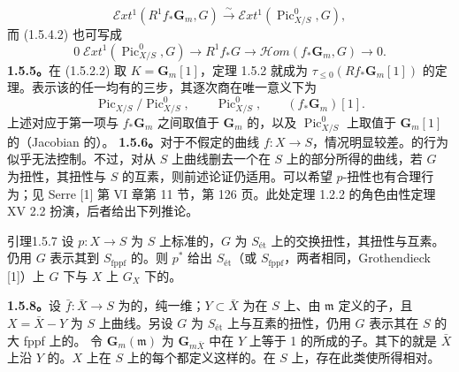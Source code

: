 \[\mathcal Ext^1(R^1f_*\mathbf G_m,G)\xrightarrow\sim\mathcal Ext^1(\operatorname{Pic}^0_{X/S},G),\]
而 (1.5.4.2) 也可写成
\[0\;\mathcal Ext^1(\operatorname{Pic}^0_{X/S},G)\to R^1f_*G\to\mathcal Hom(f_*\mathbf G_m,G)\to0.\tag{1.5.4.3}\]
\textbf{1.5.5。}在 (1.5.2.2) 取 $K=\mathbf G_m[1]$，定理 1.5.2 就成为 $\tau_{\le0}(Rf_*\mathbf G_m[1])$ 的定理。表示该的任一均有的三步，其逐次商在唯一意义下为
\[\operatorname{Pic}_{X/S}/\operatorname{Pic}^0_{X/S},\qquad\operatorname{Pic}^0_{X/S},\qquad(f_*\mathbf G_m)[1].\]
上述对应于第一项与 $f_*\mathbf G_m$ 之间取值于 $\mathbf G_m$ 的，以及 $\operatorname{Pic}^0_{X/S}$ 上取值于 $\mathbf G_m[1]$ 的（Jacobian 的）。
\textbf{1.5.6。}对于不假定的曲线 $f:X\to S$，情况明显较差。的行为似乎无法控制。不过，对从 $S$ 上曲线删去一个在 $S$ 上的部分所得的曲线，若 $G$ 为扭性，其扭性与 $S$ 的互素，则前述论证仍适用。可以希望 $p$-扭性也有合理行为；见 Serre [1] 第 VI 章第 11 节，第 126 页。此处定理 1.2.2 的角色由性定理 XV 2.2 扮演，后者给出下列推论。
\begin{SGAresult}{引理}{1.5.7}
设 $p:X\to S$ 为 $S$ 上标准的，$G$ 为 $S_{\mathrm{ét}}$ 上的交换扭性，其扭性与互素。仍用 $G$ 表示其到 $S_{\mathrm{fppf}}$ 的。则 $p^*$ 给出 $S_{\mathrm{ét}}$（或 $S_{\mathrm{fppf}}$，两者相同，Grothendieck [1]）上 $G$ 下与 $X$ 上 $G_X$ 下的。
\end{SGAresult}
\textbf{1.5.8。}设 $\bar f:\bar X\to S$ 为的，纯一维；$Y\subset\bar X$ 为在 $S$ 上、由 $\mathfrak m$ 定义的子，且 $X=\bar X-Y$ 为 $S$ 上曲线。另设 $G$ 为 $S_{\mathrm{ét}}$ 上与互素的扭性，仍用 $G$ 表示其在 $S$ 的大 fppf 上的。
令 $\mathbf G_m(\mathfrak m)$ 为 $\mathbf G_{m\bar X}$ 中在 $Y$ 上等于 1 的所成的子。其下的就是 $\bar X$ 上沿 $Y$ 的。$X$ 上在 $S$ 上的每个都定义这样的。在 $S$ 上，存在此类使所得相对。
